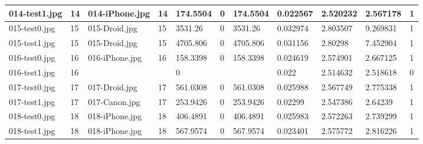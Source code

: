 \begin{landscape}
\begin{longtable}{|p{2cm}|p{1cm}|p{2cm}|p{1cm}|p{2cm}|p{1cm}|p{2cm}|p{2cm}|p{2cm}|p{2cm}|p{1cm}|}
		014-test1.jpg   & 14               & 014-iPhone.jpg        & 14                          & 174.5504              & 0                       & 174.5504                   & 0.022567              & 2.520232              & 2.567178                 & 1                \\ \hline
		015-test0.jpg   & 15               & 015-Droid.jpg         & 15                          & 3531.26               & 0                       & 3531.26                    & 0.032974              & 2.803507              & 9.269831                 & 1                \\ \hline
		015-test1.jpg   & 15               & 015-Droid.jpg         & 15                          & 4705.806              & 0                       & 4705.806                   & 0.031156              & 2.80298               & 7.452904                 & 1                \\ \hline
		016-test0.jpg   & 16               & 016-iPhone.jpg        & 16                          & 158.3398              & 0                       & 158.3398                   & 0.024619              & 2.574901              & 2.667125                 & 1                \\ \hline
		016-test1.jpg   & 16               &                       &                             & 0                     &                         &                            & 0.022                 & 2.514632              & 2.518618                 & 0                \\ \hline
		017-test0.jpg   & 17               & 017-Droid.jpg         & 17                          & 561.0308              & 0                       & 561.0308                   & 0.025988              & 2.567749              & 2.775338                 & 1                \\ \hline
		017-test1.jpg   & 17               & 017-Canon.jpg         & 17                          & 253.9426              & 0                       & 253.9426                   & 0.02299               & 2.547386              & 2.64239                  & 1                \\ \hline
		018-test0.jpg   & 18               & 018-iPhone.jpg        & 18                          & 406.4891              & 0                       & 406.4891                   & 0.025983              & 2.572263              & 2.739299                 & 1                \\ \hline
		018-test1.jpg   & 18               & 018-iPhone.jpg        & 18                          & 567.9574              & 0                       & 567.9574                   & 0.023401              & 2.575772              & 2.816226                 & 1                \\ \hline

\end{longtable}
\end{landscape}
